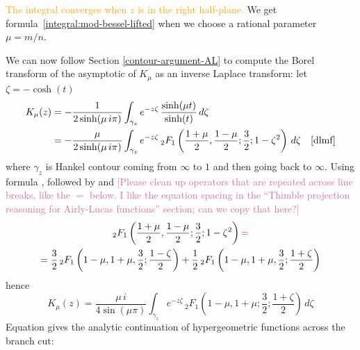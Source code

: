 \documentclass{article}
\theoremstyle{definition}
\theoremstyle{plain}
\begin{document}
\textcolor{orange}{The integral converges when $z$ is in the right half-plane.} We get formula~\eqref{integral:mod-bessel-lifted} when we choose a rational parameter $\mu = m/n$.
%

We can now follow Section \ref{contour-argument-AL} to compute the Borel transform of the asymptotic of $K_\mu$ as an inverse Laplace transform: let $\zeta=-\cosh(t)$
\begin{align*}
    K_\mu(z)& = -\frac{1}{2 \sinh(\mu\,i\pi)} \int_{\gamma_z} e^{-z \zeta}\,\frac{\sinh(\mu t)}{\sinh(t)}\,d\zeta  & \\
    &=-\frac{\mu}{2 \sinh(\mu\,i\pi)} \int_{\gamma_z} e^{-z \zeta}\, {}_2F_1\left(\frac{1+\mu}{2},\frac{1-\mu}{2};\frac{3}{2};1-\zeta^2\right)\,d\zeta & \cite[15.4.16]{dlmf}
\end{align*}
where $\gamma_z$ is Hankel contour coming from $\infty$ to $1$ and then going back to $\infty$. Using formula \cite[15.8.4]{dlmf}, followed by \cite[15.8.27]{dlmf} and \cite[15.8.28]{dlmf} \textcolor{PaleVioletRed}{[Please clean up operators that are repeated across line breaks, like the $=$ below. I like the equation spacing in the ``Thimble projection reasoning for Airly-Lucas functions'' section; can we copy that here?]}
\begin{multline*}
     {}_2F_1\left(\frac{1+\mu}{2},\frac{1-\mu}{2};\frac{3}{2};1-\zeta^2\right) \textcolor{magenta}{=} \\
     =\frac{3}{2}\, {}_2F_1\left(1-\mu,1+\mu,\frac{3}{2};\frac{1-\zeta}{2}\right)+\frac{1}{2}\, {}_2F_1\left(1-\mu,1+\mu,\frac{3}{2};\frac{1+\zeta}{2}\right)
\end{multline*}
hence 
%
\[K_\mu(z)=\frac{\mu\, i}{4 \sin(\mu\pi)} \int_{\gamma_z} e^{-z \zeta}\, {}_2F_1\left(1-\mu,1+\mu;\frac{3}{2};\frac{1+\zeta}{2}\right)\,d\zeta\]
%
Equation \cite[15.2.3]{dlmf} gives the analytic continuation of hypergeometric functions across the branch cut:
\end{document}
